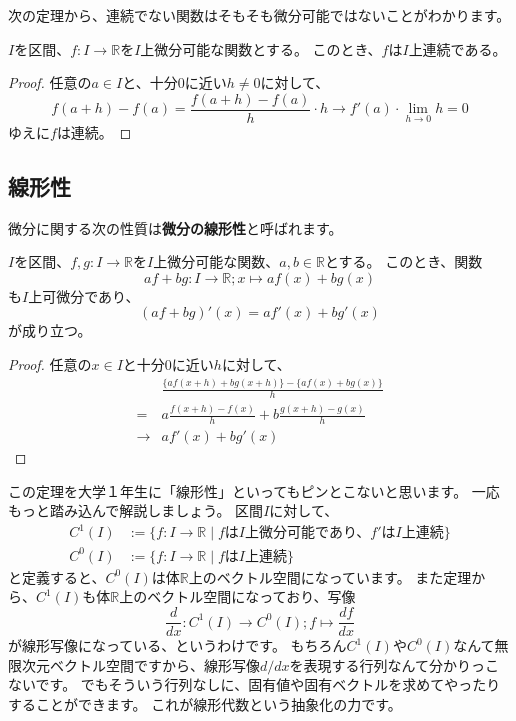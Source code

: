 次の定理から、連続でない関数はそもそも微分可能ではないことがわかります。
\begin{theorem}
  $I$を区間、$f:I\to\mathbb{R}$を$I$上微分可能な関数とする。
  このとき、$f$は$I$上連続である。
\end{theorem}
\begin{proof}
  任意の$a\in I$と、十分0に近い$h\neq0$に対して、
  \[
    f(a+h)-f(a)=\frac{f(a+h)-f(a)}{h}\cdot h\to f'(a)\cdot\lim_{h\to0}h=0
  \]
  ゆえに$f$は連続。
\end{proof}

\subsection{線形性}

微分に関する次の性質は\textbf{微分の線形性}と呼ばれます。
\begin{theorem}
  $I$を区間、$f,g:I\to\mathbb{R}$を$I$上微分可能な関数、$a,b\in\mathbb{R}$とする。
  このとき、関数
  \[
    af+bg:I\to\mathbb{R};x\mapsto af(x)+bg(x)
  \]
  も$I$上可微分であり、
  \[
    (af+bg)'(x)=af'(x)+bg'(x)
  \]
  が成り立つ。
\end{theorem}
\begin{proof}
  任意の$x\in I$と十分0に近い$h$に対して、
  \begin{align*}
    &\frac{\{af(x+h)+bg(x+h)\}-\{af(x)+bg(x)\}}{h}\\
    =&a\frac{f(x+h)-f(x)}{h}+b\frac{g(x+h)-g(x)}{h}\\
    \to&af'(x)+bg'(x)
  \end{align*}
\end{proof}

この定理を大学１年生に「線形性」といってもピンとこないと思います。
一応もっと踏み込んで解説しましょう。
区間$I$に対して、
\begin{align*}
  C^1(I)&:=\{f:I\to\mathbb{R}\mid\text{$f$は$I$上微分可能であり、$f'$は$I$上連続}\}\\
  C^0(I)&:=\{f:I\to\mathbb{R}\mid\text{$f$は$I$上連続}\}
\end{align*}
と定義すると、$C^0(I)$は体$\mathbb{R}$上のベクトル空間になっています。
また定理から、$C^1(I)$も体$\mathbb{R}$上のベクトル空間になっており、写像
\[
  \frac{d}{dx}:C^1(I)\to C^0(I);f\mapsto\frac{df}{dx}
\]
が線形写像になっている、というわけです。
もちろん$C^1(I)$や$C^0(I)$なんて無限次元ベクトル空間ですから、線形写像$d/dx$を表現する行列なんて分かりっこないです。
でもそういう行列なしに、固有値や固有ベクトルを求めてやったりすることができます。
これが線形代数という抽象化の力です。

